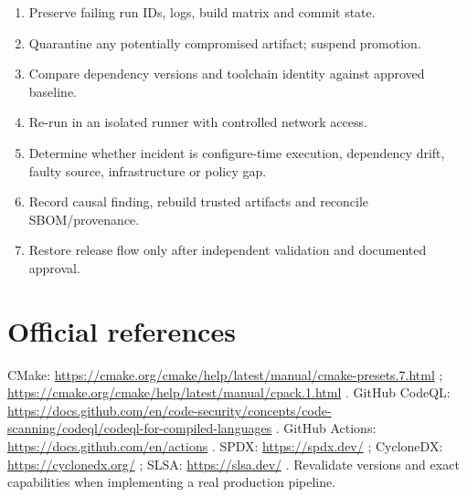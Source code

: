 \documentclass[11pt,letterpaper,oneside]{report}
\providecommand{\tightlist}{\setlength{\itemsep}{0pt}\setlength{\parskip}{0pt}}
\begin{document}
\begin{enumerate}
\def\labelenumi{\arabic{enumi}.}
\tightlist
\item
  Preserve failing run IDs, logs, build matrix and commit state.
\item
  Quarantine any potentially compromised artifact; suspend promotion.
\item
  Compare dependency versions and toolchain identity against approved
  baseline.
\item
  Re-run in an isolated runner with controlled network access.
\item
  Determine whether incident is configure-time execution, dependency
  drift, faulty source, infrastructure or policy gap.
\item
  Record causal finding, rebuild trusted artifacts and reconcile
  SBOM/provenance.
\item
  Restore release flow only after independent validation and documented
  approval.
\end{enumerate}

\chapter{Official references}\label{official-references}

CMake:
\url{https://cmake.org/cmake/help/latest/manual/cmake-presets.7.html} ;
\url{https://cmake.org/cmake/help/latest/manual/cpack.1.html} . GitHub
CodeQL:
\url{https://docs.github.com/en/code-security/concepts/code-scanning/codeql/codeql-for-compiled-languages}
. GitHub Actions: \url{https://docs.github.com/en/actions} . SPDX:
\url{https://spdx.dev/} ; CycloneDX: \url{https://cyclonedx.org/} ;
SLSA: \url{https://slsa.dev/} . Revalidate versions and exact
capabilities when implementing a real production pipeline.
\end{document}
